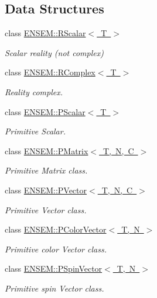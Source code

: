 \subsection*{Data Structures}
\begin{DoxyCompactItemize}
\item 
class \mbox{\hyperlink{classENSEM_1_1RScalar}{E\+N\+S\+E\+M\+::\+R\+Scalar$<$ T $>$}}
\begin{DoxyCompactList}\small\item\em Scalar reality (not complex) \end{DoxyCompactList}\item 
class \mbox{\hyperlink{classENSEM_1_1RComplex}{E\+N\+S\+E\+M\+::\+R\+Complex$<$ T $>$}}
\begin{DoxyCompactList}\small\item\em Reality complex. \end{DoxyCompactList}\item 
class \mbox{\hyperlink{classENSEM_1_1PScalar}{E\+N\+S\+E\+M\+::\+P\+Scalar$<$ T $>$}}
\begin{DoxyCompactList}\small\item\em Primitive Scalar. \end{DoxyCompactList}\item 
class \mbox{\hyperlink{classENSEM_1_1PMatrix}{E\+N\+S\+E\+M\+::\+P\+Matrix$<$ T, N, C $>$}}
\begin{DoxyCompactList}\small\item\em Primitive Matrix class. \end{DoxyCompactList}\item 
class \mbox{\hyperlink{classENSEM_1_1PVector}{E\+N\+S\+E\+M\+::\+P\+Vector$<$ T, N, C $>$}}
\begin{DoxyCompactList}\small\item\em Primitive Vector class. \end{DoxyCompactList}\item 
class \mbox{\hyperlink{classENSEM_1_1PColorVector}{E\+N\+S\+E\+M\+::\+P\+Color\+Vector$<$ T, N $>$}}
\begin{DoxyCompactList}\small\item\em Primitive color Vector class. \end{DoxyCompactList}\item 
class \mbox{\hyperlink{classENSEM_1_1PSpinVector}{E\+N\+S\+E\+M\+::\+P\+Spin\+Vector$<$ T, N $>$}}
\begin{DoxyCompactList}\small\item\em Primitive spin Vector class. \end{DoxyCompactList}\item 

\end{DoxyCompactItemize}
